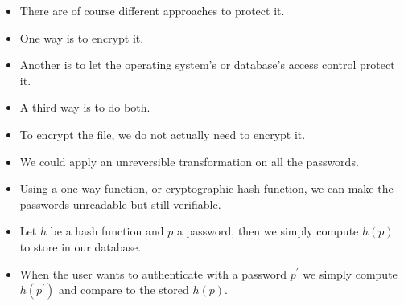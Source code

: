 \documentclass{beamer}
\begin{document}
\begin{frame}{\insertsubsectionhead}
  \begin{itemize}
    \item There are of course different approaches to protect it.

    \item One way is to encrypt it.

    \item Another is to let the operating system's or database's access control 
      protect it.

    \item A third way is to do both.

  \end{itemize}
\end{frame}

\begin{frame}{\insertsubsectionhead}
  \begin{itemize}
    \item To encrypt the file, we do not actually need to encrypt it.

    \item We could apply an unreversible transformation on all the passwords.

    \item Using a one-way function, or cryptographic hash function, we can make 
      the passwords unreadable but still verifiable.

    \item Let \(h\) be a hash function and \(p\) a password, then we simply 
      compute \(h(p)\) to store in our database.

    \item When the user wants to authenticate with a password \(p^\prime\) we 
      simply compute \(h(p^\prime)\) and compare to the stored \(h(p)\).

  \end{itemize}
\end{frame}
\end{document}
